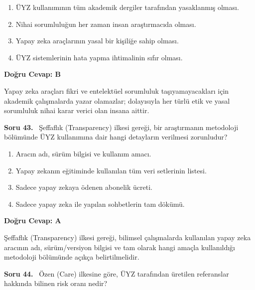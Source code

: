 \documentclass[11pt,a4paper,openany]{book}
\begin{document}
\begin{enumerate}[label=\Alph*), leftmargin=25pt, topsep=4pt, itemsep=2pt]
        \item ÜYZ kullanımının tüm akademik dergiler tarafından yasaklanmış olması.
        \item Nihai sorumluluğun her zaman insan araştırmacıda olması.
        \item Yapay zeka araçlarının yasal bir kişiliğe sahip olması.
        \item ÜYZ sistemlerinin hata yapma ihtimalinin sıfır olması.
\end{enumerate}

\vspace{4pt}
\begin{tcolorbox}[title=Cevap ve Açıklama, colback=gray!3!white, colframe=primarycolor!90!black, arc=2mm, fonttitle=\bfseries\sffamily, top=6pt, bottom=6pt]
    \textbf{Doğru Cevap: B}

    \vspace{2pt}
    Yapay zeka araçları fikri ve entelektüel sorumluluk taşıyamayacakları için akademik çalışmalarda yazar olamazlar; dolayısıyla her türlü etik ve yasal sorumluluk nihai karar verici olan insana aittir.
\end{tcolorbox}
\vspace{10pt}
\needspace{5cm}
\vspace{8pt}
\noindent\textbf{\large\sffamily Soru 43.} \ Şeffaflık (Transparency) ilkesi gereği, bir araştırmanın metodoloji bölümünde ÜYZ kullanımına dair hangi detayların verilmesi zorunludur?

\begin{enumerate}[label=\Alph*), leftmargin=25pt, topsep=4pt, itemsep=2pt]
        \item Aracın adı, sürüm bilgisi ve kullanım amacı.
        \item Yapay zekanın eğitiminde kullanılan tüm veri setlerinin listesi.
        \item Sadece yapay zekaya ödenen abonelik ücreti.
        \item Sadece yapay zeka ile yapılan sohbetlerin tam dökümü.
\end{enumerate}

\vspace{4pt}
\begin{tcolorbox}[title=Cevap ve Açıklama, colback=gray!3!white, colframe=primarycolor!90!black, arc=2mm, fonttitle=\bfseries\sffamily, top=6pt, bottom=6pt]
    \textbf{Doğru Cevap: A}

    \vspace{2pt}
    Şeffaflık (Transparency) ilkesi gereği, bilimsel çalışmalarda kullanılan yapay zeka aracının adı, sürüm/versiyon bilgisi ve tam olarak hangi amaçla kullanıldığı metodoloji bölümünde açıkça belirtilmelidir.
\end{tcolorbox}
\vspace{10pt}
\needspace{5cm}
\vspace{8pt}
\noindent\textbf{\large\sffamily Soru 44.} \ Özen (Care) ilkesine göre, ÜYZ tarafından üretilen referanslar hakkında bilinen risk oranı nedir?
\end{document}
